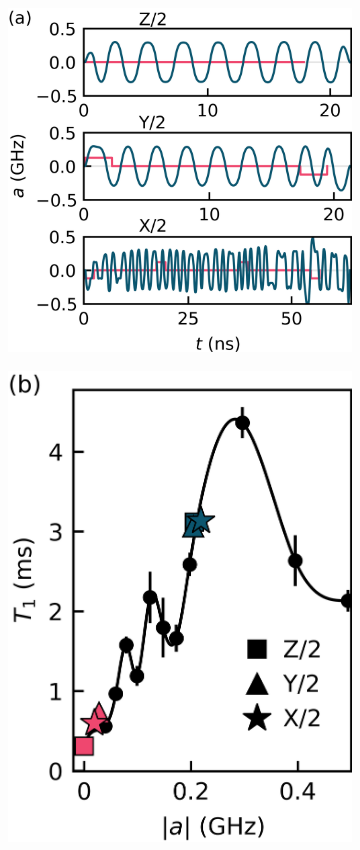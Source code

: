 \documentclass[
  amsfonts,
  amsmath,
  amssymb,
  pra,
  twocolumn,
  superscriptaddress,
]{revtex4-2}
\begin{document}
\begin{figure}[ht]
  \begin{subfigure}{.315\textwidth}
    \includegraphics[width=\linewidth]{f1a.png}
    \caption{\label{fig:longitudea}}
  \end{subfigure}\hfill
  \begin{subfigure}{.23\textwidth}
    \includegraphics[width=\linewidth]{f1b.png}

\end{subfigure}
\end{figure}
\end{document}
